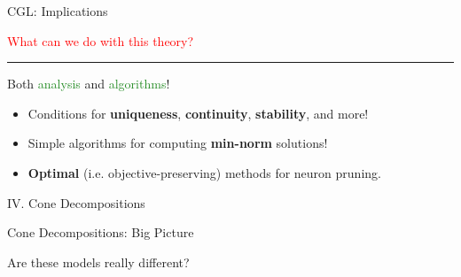 \documentclass[usenames,dvipsnames,mathserif,notheorems]{beamer}
\newcommand{\horizontalrule}{
	{
			\vspace{-0.5em}
			\center \rule{\textwidth}{0.1em}
			\vspace{-0.2em}
		}
}
\newcommand{\red}[1]{\textcolor{Red}{#1}}
\newcommand{\green}[1]{\textcolor{ForestGreen}{#1}}
\begin{document}
\begin{frame}{CGL: Implications}
	\begin{center}
		\Large
		\red{What can we do with this theory?}
	\end{center}

	\pause
	\horizontalrule

	\begin{center}
		\Large Both \green{analysis} and \green{algorithms}!
	\end{center}

	\pause
	\begin{itemize}
		\large
		\item Conditions for \textbf{uniqueness},
		      \textbf{continuity}, \textbf{stability}, and more!

		      \pause
		      \vspace{1ex}
		\item Simple algorithms for computing \textbf{min-norm} solutions!
		      \pause
		      \vspace{1ex}

		\item \textbf{Optimal} (i.e. objective-preserving) methods for neuron pruning.
	\end{itemize}

\end{frame}


\begin{frame}{}
	\begin{center}
		\huge IV. Cone Decompositions
	\end{center}
\end{frame}

\begin{frame}{Cone Decompositions: Big Picture}
	\begin{center}
		\Large Are these models really different?
	\end{center}

	\begin{figure}[]
		\centering
		
	\end{figure}
\end{frame}
\end{document}
